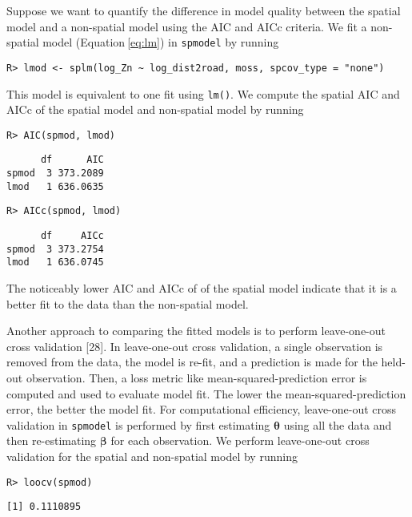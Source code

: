 \documentclass[10pt,letterpaper]{article}
\begin{document}
Suppose we want to quantify the difference in model quality between the
spatial model and a non-spatial model using the AIC and AICc criteria.
We fit a non-spatial model (Equation\(~\)\ref{eq:lm}) in
\texttt{spmodel} by running

\begin{verbatim}
R> lmod <- splm(log_Zn ~ log_dist2road, moss, spcov_type = "none")
\end{verbatim}

This model is equivalent to one fit using \texttt{lm()}. We compute the
spatial AIC and AICc of the spatial model and non-spatial model by
running

\begin{verbatim}
R> AIC(spmod, lmod)
\end{verbatim}

\begin{verbatim}
      df      AIC
spmod  3 373.2089
lmod   1 636.0635
\end{verbatim}

\begin{verbatim}
R> AICc(spmod, lmod)
\end{verbatim}

\begin{verbatim}
      df     AICc
spmod  3 373.2754
lmod   1 636.0745
\end{verbatim}

The noticeably lower AIC and AICc of of the spatial model indicate that
it is a better fit to the data than the non-spatial model.

Another approach to comparing the fitted models is to perform
leave-one-out cross validation {[}28{]}. In leave-one-out cross
validation, a single observation is removed from the data, the model is
re-fit, and a prediction is made for the held-out observation. Then, a
loss metric like mean-squared-prediction error is computed and used to
evaluate model fit. The lower the mean-squared-prediction error, the
better the model fit. For computational efficiency, leave-one-out cross
validation in \texttt{spmodel} is performed by first estimating
\(\boldsymbol{\theta}\) using all the data and then re-estimating
\(\boldsymbol{\beta}\) for each observation. We perform leave-one-out
cross validation for the spatial and non-spatial model by running

\begin{verbatim}
R> loocv(spmod)
\end{verbatim}

\begin{verbatim}
[1] 0.1110895
\end{verbatim}
\end{document}
